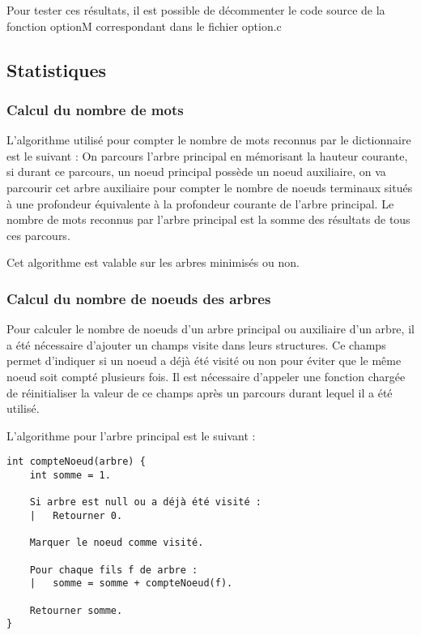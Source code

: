 \documentclass[15pt, a4paper]{article}
\begin{document}
Pour tester ces résultats, il est possible de décommenter le code source 
de la fonction optionM correspondant dans le fichier option.c

\subsection{Statistiques}

\subsubsection{Calcul du nombre de mots}

L'algorithme utilisé pour compter le nombre de mots reconnus par le dictionnaire
est le suivant : On parcours l'arbre principal en mémorisant la hauteur 
courante, si durant ce parcours, un noeud principal possède un noeud auxiliaire,
on va parcourir cet arbre auxiliaire pour compter le nombre de noeuds 
terminaux situés à une profondeur équivalente à la profondeur courante de l'arbre
principal. Le nombre de mots reconnus par l'arbre principal est la somme des 
résultats de tous ces parcours.

\bigskip

\noindent Cet algorithme est valable sur les arbres minimisés ou non.

\subsubsection{Calcul du nombre de noeuds des arbres}

Pour calculer le nombre de noeuds d'un arbre principal ou auxiliaire d'un arbre, 
il a été nécessaire 
d'ajouter un champs visite dans leurs structures. Ce champs 
permet d'indiquer si un noeud a déjà été visité ou non pour éviter que le même
noeud soit compté plusieurs fois. Il est nécessaire d'appeler une fonction chargée
de réinitialiser la valeur de ce champs après un parcours durant lequel il a été
utilisé.

\bigskip

\noindent L'algorithme pour l'arbre principal est le suivant : 

\bigskip

\begin{verbatim}
int compteNoeud(arbre) {
    int somme = 1.

    Si arbre est null ou a déjà été visité :
    |   Retourner 0.

    Marquer le noeud comme visité.

    Pour chaque fils f de arbre :
    |   somme = somme + compteNoeud(f).

    Retourner somme.
}
\end{verbatim}
\end{document}
